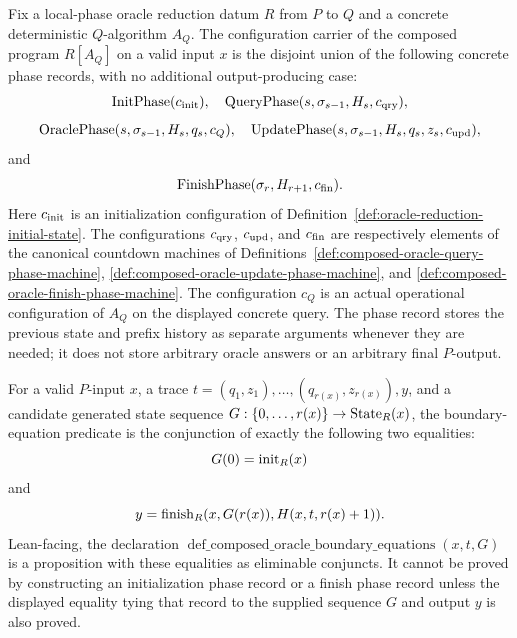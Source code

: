 \begin{definition}
  \label{def:composed-oracle-phase-records}
  Fix a local-phase oracle reduction datum $R$ from $P$ to $Q$ and a concrete
  deterministic $Q$-algorithm $A_Q$.  The configuration carrier of the composed
  program $R[A_Q]$ on a valid input $x$ is the disjoint union of the following
  concrete phase records, with no additional output-producing case:
  \[
    \operatorname{InitPhase}(c_{\rm init}),
    \quad
    \operatorname{QueryPhase}(s,\sigma_{s-1},H_s,c_{\rm qry}),
  \]
  \[
    \operatorname{OraclePhase}(s,\sigma_{s-1},H_s,q_s,c_Q),
    \quad
    \operatorname{UpdatePhase}(s,\sigma_{s-1},H_s,q_s,z_s,c_{\rm upd}),
  \]
  and
  \[
    \operatorname{FinishPhase}(\sigma_r,H_{r+1},c_{\rm fin}).
  \]
  Here $c_{\rm init}$ is an initialization configuration of
  Definition~\ref{def:oracle-reduction-initial-state}.  The configurations
  $c_{\rm qry}$, $c_{\rm upd}$, and $c_{\rm fin}$ are respectively elements of
  the canonical countdown machines of
  Definitions~\ref{def:composed-oracle-query-phase-machine},
  \ref{def:composed-oracle-update-phase-machine}, and
  \ref{def:composed-oracle-finish-phase-machine}.  The configuration $c_Q$ is
  an actual operational configuration of $A_Q$ on the displayed concrete query.
  The phase record stores the previous state and prefix history as separate
  arguments whenever they are needed; it does not store arbitrary oracle
  answers or an arbitrary final $P$-output.
\end{definition}

\begin{definition}
  \label{def:composed-oracle-boundary-equations}
  For a valid $P$-input $x$, a trace
  $t=(q_1,z_1),\ldots,(q_{r(x)},z_{r(x)}),y$, and a candidate generated state
  sequence $G:\{0,\ldots,r(x)\}\to\operatorname{State}_R(x)$, the boundary-equation
  predicate is the conjunction of exactly the following two equalities:
  \[
    G(0)=\operatorname{init}_R(x)
  \]
  and
  \[
    y=\operatorname{finish}_R(x,G(r(x)),H(x,t,r(x)+1)).
  \]
  Lean-facing, the declaration
  $\operatorname{def\_composed\_oracle\_boundary\_equations}(x,t,G)$ is a
  proposition with these equalities as eliminable conjuncts.  It cannot be
  proved by constructing an initialization phase record or a finish phase
  record unless the displayed equality tying that record to the supplied
  sequence $G$ and output $y$ is also proved.
\end{definition}

